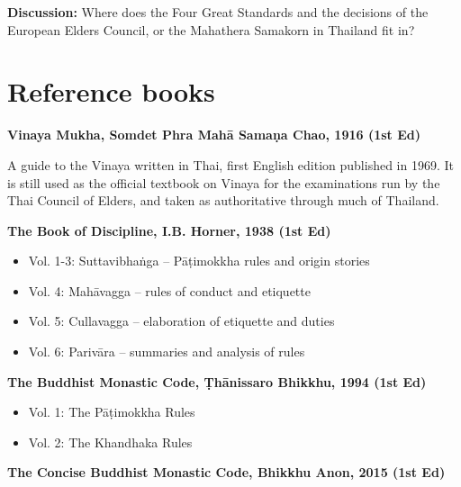\textbf{Discussion:} Where does the Four Great Standards and the
decisions of the European Elders Council, or the Mahathera Samakorn in
Thailand fit in?

\section{Reference books}

\textbf{Vinaya Mukha, Somdet Phra Mahā Samaṇa Chao, 1916 (1st Ed)}

A guide to the Vinaya written in Thai, first English edition published
in 1969. It is still used as the official textbook on Vinaya for the
examinations run by the Thai Council of Elders, and taken as
authoritative through much of Thailand.

\textbf{The Book of Discipline, I.B. Horner, 1938 (1st Ed)}

\begin{itemize}
\tightlist
\item
  Vol. 1-3: Suttavibhaṅga -- Pāṭimokkha rules and origin stories
\item
  Vol. 4: Mahāvagga -- rules of conduct and etiquette
\item
  Vol. 5: Cullavagga -- elaboration of etiquette and duties
\item
  Vol. 6: Parivāra -- summaries and analysis of rules
\end{itemize}

\textbf{The Buddhist Monastic Code, Ṭhānissaro Bhikkhu, 1994 (1st Ed)}

\begin{itemize}
\tightlist
\item
  Vol. 1: The Pāṭimokkha Rules
\item
  Vol. 2: The Khandhaka Rules
\end{itemize}

\textbf{The Concise Buddhist Monastic Code, Bhikkhu Anon, 2015 (1st Ed)}


